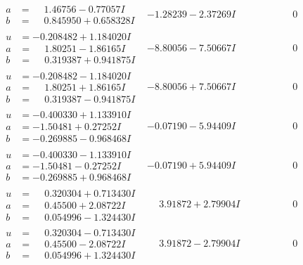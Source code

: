 \documentclass[1p]{elsarticle_modified}
\theoremstyle{definition}
\begin{document}
$$\begin{array}{c|c|c}
\begin{aligned}
a &= \phantom{-}1.46756 - 0.77057 I \\
b &= \phantom{-}0.845950 + 0.658328 I\end{aligned}
 & -1.28239 - 2.37269 I & \phantom{-0.000000 } 0 \\ \hline\begin{aligned}
u &= -0.208482 + 1.184020 I \\
a &= \phantom{-}1.80251 - 1.86165 I \\
b &= \phantom{-}0.319387 + 0.941875 I\end{aligned}
 & -8.80056 - 7.50667 I & \phantom{-0.000000 } 0 \\ \hline\begin{aligned}
u &= -0.208482 - 1.184020 I \\
a &= \phantom{-}1.80251 + 1.86165 I \\
b &= \phantom{-}0.319387 - 0.941875 I\end{aligned}
 & -8.80056 + 7.50667 I & \phantom{-0.000000 } 0 \\ \hline\begin{aligned}
u &= -0.400330 + 1.133910 I \\
a &= -1.50481 + 0.27252 I \\
b &= -0.269885 - 0.968468 I\end{aligned}
 & -0.07190 - 5.94409 I & \phantom{-0.000000 } 0 \\ \hline\begin{aligned}
u &= -0.400330 - 1.133910 I \\
a &= -1.50481 - 0.27252 I \\
b &= -0.269885 + 0.968468 I\end{aligned}
 & -0.07190 + 5.94409 I & \phantom{-0.000000 } 0 \\ \hline\begin{aligned}
u &= \phantom{-}0.320304 + 0.713430 I \\
a &= \phantom{-}0.45500 + 2.08722 I \\
b &= \phantom{-}0.054996 - 1.324430 I\end{aligned}
 & \phantom{-}3.91872 + 2.79904 I & \phantom{-0.000000 } 0 \\ \hline\begin{aligned}
u &= \phantom{-}0.320304 - 0.713430 I \\
a &= \phantom{-}0.45500 - 2.08722 I \\
b &= \phantom{-}0.054996 + 1.324430 I\end{aligned}
 & \phantom{-}3.91872 - 2.79904 I & \phantom{-0.000000 } 0 \\ \hline\begin{aligned}

\end{aligned}
\end{array}$$
\end{document}
